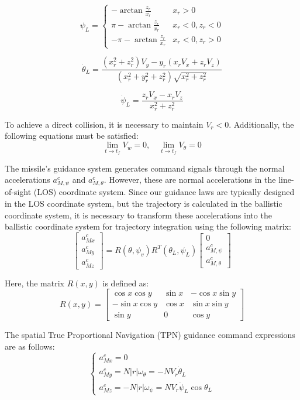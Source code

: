 \documentclass{article}
\begin{document}
\[
\psi_L = 
\begin{cases} 
-\arctan \frac{z_r}{x_r} & x_r > 0 \\ 
\pi - \arctan \frac{z_r}{x_r} & x_r < 0, z_r < 0 \\ 
-\pi - \arctan \frac{z_r}{x_r} & x_r < 0, z_r > 0 
\end{cases}
\tag{1-33}
\]

\[
\dot{\theta}_L = \frac{(x_r^2 + z_r^2)V_y - y_r(x_rV_x + z_rV_z)}{(x_r^2 + y_r^2 + z_r^2)\sqrt{x_r^2 + z_r^2}}
\tag{1-34}
\]

\[
\dot{\psi}_L = \frac{z_rV_x - x_rV_z}{x_r^2 + z_r^2}
\tag{1-35}
\]

To achieve a direct collision, it is necessary to maintain \( V_r < 0 \). Additionally, the following equations must be satisfied:
\[
\lim_{t \to t_f} V_w = 0, \quad \lim_{t \to t_f} V_\theta = 0
\tag{1-36}
\]

The missile's guidance system generates command signals through the normal accelerations \( a^c_{M,\psi} \) and \( a^c_{M,\theta} \). However, these are normal accelerations in the line-of-sight (LOS) coordinate system. Since our guidance laws are typically designed in the LOS coordinate system, but the trajectory is calculated in the ballistic coordinate system, it is necessary to transform these accelerations into the ballistic coordinate system for trajectory integration using the following matrix:
\[
\begin{bmatrix}
a^c_{Mx} \\
a^c_{My} \\
a^c_{Mz}
\end{bmatrix}
= R(\theta, \psi_v) R^T(\theta_L, \psi_L)
\begin{bmatrix}
0 \\
a^c_{M,\psi} \\
a^c_{M,\theta}
\end{bmatrix}
\tag{1-37}
\]

Here, the matrix \( R(x, y) \) is defined as:
\[
R(x, y) =
\begin{bmatrix}
\cos x \cos y & \sin x & -\cos x \sin y \\
-\sin x \cos y & \cos x & \sin x \sin y \\
\sin y & 0 & \cos y
\end{bmatrix}
\tag{1-38}
\]

The spatial True Proportional Navigation (TPN) guidance command expressions are as follows:
\[
\begin{cases}
a^c_{Mx} = 0 \\
a^c_{My} = N|r| \omega_\theta = -NV_r \dot{\theta}_L \\
a^c_{Mz} = -N|r| \omega_\psi = NV_r \dot{\psi}_L \cos \theta_L
\end{cases}
\tag{1-39}
\]
\end{document}
